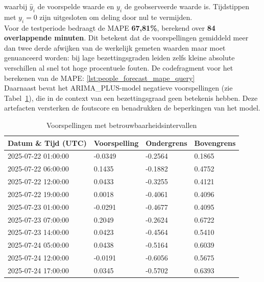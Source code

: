 waarbij $\hat{y}_i$ de voorspelde waarde en $y_i$ de geobserveerde waarde is. Tijdstippen met $y_i = 0$ zijn uitgesloten om deling door nul te vermijden. \\

Voor de testperiode bedraagt de MAPE \textbf{67,81\%}, berekend over \textbf{84 overlappende minuten}. Dit betekent dat de voorspellingen gemiddeld meer dan twee derde afwijken van de werkelijk gemeten waarden maar moet genuanceerd worden: bij lage bezettingsgraden leiden zelfs kleine absolute verschillen al snel tot hoge procentuele fouten. De codefragment voor het berekenen van de MAPE: \ref{lst:people_forecast_mape_query} \\

Daarnaast bevat het ARIMA\_PLUS-model negatieve voorspellingen (zie Tabel~\ref{tab:voorspellingen}), die in de context van een bezettingsgraad geen betekenis hebben. Deze artefacten versterken de foutscore en benadrukken de beperkingen van het model.

\begin{table}[h!]
    \centering
    \begin{tabular}{|p{5cm}|p{3cm}|p{3cm}|p{3cm}|}
        \hline
        \textbf{Datum \& Tijd (UTC)} & \textbf{Voorspelling} & \textbf{Ondergrens} & \textbf{Bovengrens} \\
        \hline
        2025-07-22 01:00:00 & -0.0349 & -0.2564 & 0.1865 \\
        2025-07-22 06:00:00 &  0.1435 & -0.1882 & 0.4752 \\
        2025-07-22 12:00:00 &  0.0433 & -0.3255 & 0.4121 \\
        2025-07-22 19:00:00 &  0.0018 & -0.4061 & 0.4096 \\
        2025-07-23 01:00:00 & -0.0291 & -0.4677 & 0.4095 \\
        2025-07-23 07:00:00 &  0.2049 & -0.2624 & 0.6722 \\
        2025-07-23 14:00:00 &  0.0423 & -0.4564 & 0.5410 \\
        2025-07-24 05:00:00 &  0.0438 & -0.5164 & 0.6039 \\
        2025-07-24 12:00:00 & -0.0191 & -0.6056 & 0.5675 \\
        2025-07-24 17:00:00 &  0.0345 & -0.5702 & 0.6393 \\
        \hline
    \end{tabular}
    \caption{Voorspellingen met betrouwbaarheidsintervallen}
    \label{tab:voorspellingen}
\end{table}

